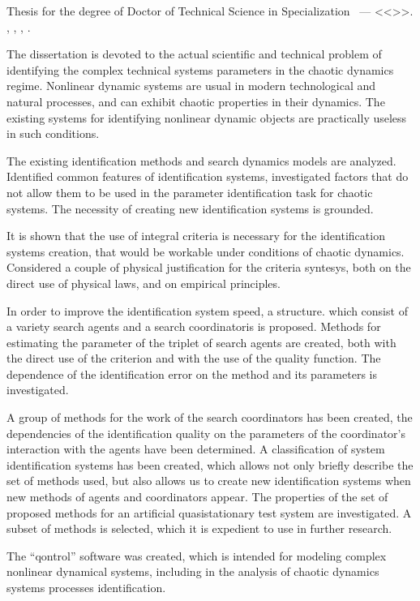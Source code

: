 \documentclass[a4paper,13pt]{atuaref}
\begin{document}
Thesis for the degree of Doctor of Technical Science in Specialization
\dissSpecId\ --- <<\dissSpecEn>>.
\institutionEn, \belongEn, \cityEn, \bookyear.

The dissertation is devoted to the actual scientific and technical problem of
identifying the complex technical systems parameters in the chaotic dynamics regime.
Nonlinear dynamic systems are usual in modern technological and natural processes,
and can exhibit chaotic properties in their dynamics.
The existing systems for identifying nonlinear dynamic objects are practically
useless in such conditions.

The existing identification methods and search dynamics models are analyzed.
Identified common features of identification systems, investigated factors that
do not allow them to be used in the parameter identification task for chaotic systems.
The necessity of creating new identification systems is grounded.

It is shown that the use of integral criteria is necessary
for the identification systems creation, that would be workable under conditions of chaotic
dynamics. Considered a couple of physical justification for the criteria syntesys,
both on the direct use of physical laws, and on empirical principles.

In order to improve the identification system speed,
a structure. which consist of a variety search agents and a search coordinatoris is proposed.
Methods for estimating the parameter of the triplet of search agents are created, both with
the direct use of the criterion and with the use of the quality function. The
dependence of the identification error on the method and its parameters is
investigated.

A group of methods for the work of the search coordinators has been created,
the dependencies of the identification quality on the parameters of the
coordinator's interaction with the agents have been determined. A
classification of system identification systems has been created, which allows
not only briefly describe the set of methods used, but also allows us to
create new identification systems when new methods of agents and coordinators
appear. The properties of the set of proposed methods for an artificial
quasistationary test system are investigated. A subset of methods is selected,
which it is expedient to use in further research.

The ``qontrol'' software was created, which is intended for modeling complex
nonlinear dynamical systems, including in the analysis of chaotic dynamics systems processes identification.
\end{document}
